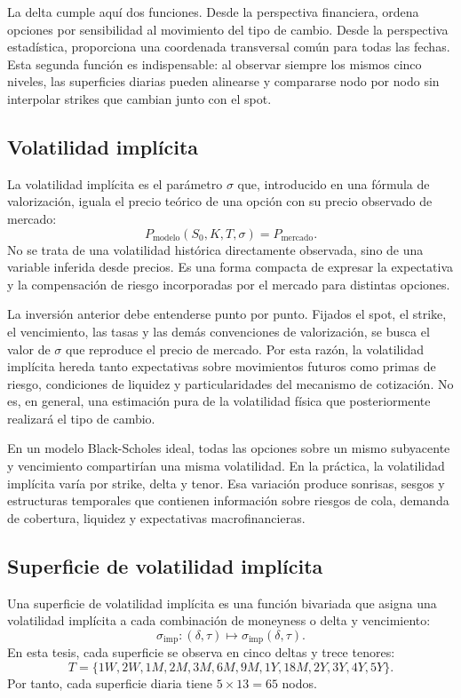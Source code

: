 \documentclass[a4paper,11pt]{article}
\newcommand{\SVI}{superficie de volatilidad implícita}
\begin{document}
La delta cumple aquí dos funciones. Desde la perspectiva financiera, ordena opciones por sensibilidad al movimiento del tipo de cambio. Desde la perspectiva estadística, proporciona una coordenada transversal común para todas las fechas. Esta segunda función es indispensable: al observar siempre los mismos cinco niveles, las superficies diarias pueden alinearse y compararse nodo por nodo sin interpolar strikes que cambian junto con el spot.

\subsection{Volatilidad implícita}

La volatilidad implícita es el parámetro \(\sigma\) que, introducido en una fórmula de valorización, iguala el precio teórico de una opción con su precio observado de mercado:
\[
  P_{\text{modelo}}(S_0,K,T,\sigma)=P_{\text{mercado}}.
\]
No se trata de una volatilidad histórica directamente observada, sino de una variable inferida desde precios. Es una forma compacta de expresar la expectativa y la compensación de riesgo incorporadas por el mercado para distintas opciones.

La inversión anterior debe entenderse punto por punto. Fijados el spot, el strike, el vencimiento, las tasas y las demás convenciones de valorización, se busca el valor de \(\sigma\) que reproduce el precio de mercado. Por esta razón, la volatilidad implícita hereda tanto expectativas sobre movimientos futuros como primas de riesgo, condiciones de liquidez y particularidades del mecanismo de cotización. No es, en general, una estimación pura de la volatilidad física que posteriormente realizará el tipo de cambio.

En un modelo Black-Scholes ideal, todas las opciones sobre un mismo subyacente y vencimiento compartirían una misma volatilidad. En la práctica, la volatilidad implícita varía por strike, delta y tenor. Esa variación produce sonrisas, sesgos y estructuras temporales que contienen información sobre riesgos de cola, demanda de cobertura, liquidez y expectativas macrofinancieras.

\subsection{Superficie de volatilidad implícita}

Una \SVI{} es una función bivariada que asigna una volatilidad implícita a cada combinación de moneyness o delta y vencimiento:
\[
  \sigma_{\text{imp}}:(\delta,\tau)\mapsto \sigma_{\text{imp}}(\delta,\tau).
\]
En esta tesis, cada superficie se observa en cinco deltas y trece tenores:
\[
T=\{1W,2W,1M,2M,3M,6M,9M,1Y,18M,2Y,3Y,4Y,5Y\}.
\]
Por tanto, cada superficie diaria tiene \(5\times 13=65\) nodos.
\end{document}
